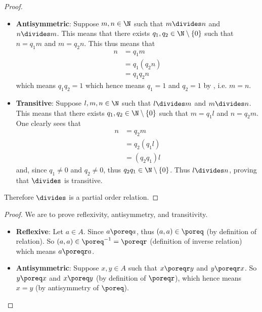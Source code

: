 \begin{questions}
\begin{proof}
\begin{itemize}
            \item \textbf{Antisymmetric}: Suppose $m, n \in \N$ such that $m \divides n$ and $n \divides m$. This means that there exists $q_1, q_2 \in \N \setminus \{0\}$ such that $n = q_1m$ and $m = q_2n$. This thus means that
            \begin{align*}
                n &= q_1m\\
                &= q_1(q_2n)\\
                &= q_1q_2n
            \end{align*}
            which means $q_1q_2 = 1$ which hence means $q_1 = 1$ and $q_2 = 1$ by , i.e. $m = n$.
            
            \item \textbf{Transitive}: Suppose $l, m, n \in \N$ such that $l \divides m$ and $m \divides n$. This means that there exists $q_1, q_2 \in \N \setminus \{0\}$ such that $m = q_1l$ and $n = q_2m$. One clearly sees that
            \begin{align*}
                n &= q_2m \\
                &= q_2(q_1l)\\
                &= (q_2q_1)l
            \end{align*}
            and, since $q_1 \neq 0$ and $q_2 \neq 0$, thus $q_2q_1 \in \N\setminus\{0\}$. Thus $l \divides n$, proving that $\divides$ is transitive.
        \end{itemize}
        Therefore $\divides$ is a partial order relation.
    \end{proof}

    \item \begin{partquestions}{\alph*}
        \item \begin{proof}
            We are to prove reflexivity, antisymmetry, and transitivity.
            \begin{itemize}
                \item \textbf{Reflexive}: Let $a \in A$. Since $a \poreq a$, thus $(a, a) \in \poreq$ (by definition of relation). So $(a, a) \in \poreq^{-1} = \poreqr$ (definition of inverse relation) which means $a \poreqr a$.
                
                \item \textbf{Antisymmetric}: Suppose $x, y \in A$ such that $x \poreqr y$ and $y \poreqr x$. So $y \poreq x$ and $x \poreq y$ (by definition of $\poreqr$), which hence means $x = y$ (by antisymmetry of $\poreq$).
                

\end{itemize}
\end{proof}
\end{partquestions}
\end{questions}
